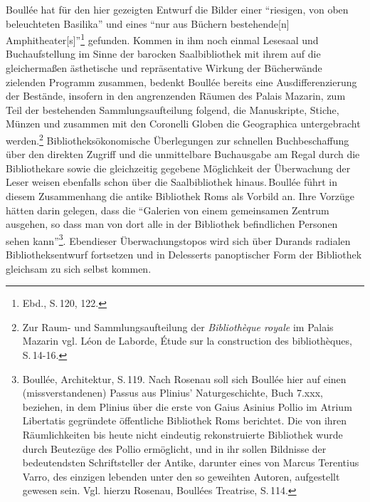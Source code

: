 Boullée hat für den hier gezeigten Entwurf die Bilder einer
\enquote{riesigen, von oben beleuchteten Basilika} und eines
\enquote{nur aus Büchern bestehende{[}n{]}
Amphitheater{[}s{]}}\footnote{Ebd., S.\,120, 122.} gefunden. Kommen in
ihm noch einmal Lesesaal und Buchaufstellung im Sinne der barocken
Saalbibliothek mit ihrem auf die gleichermaßen ästhetische und
repräsentative Wirkung der Bücherwände zielenden Programm zusammen,
bedenkt Boullée bereits eine Ausdifferenzierung der Bestände, insofern
in den angrenzenden Räumen des Palais Mazarin, zum Teil der bestehenden
Sammlungsaufteilung folgend, die Manuskripte, Stiche, Münzen und
zusammen mit den Coronelli Globen die Geographica untergebracht
werden.\footnote{Zur Raum- und Sammlungsaufteilung der
  \emph{Bibliothèque royale} im Palais Mazarin vgl. Léon de Laborde,
  Étude sur la construction des bibliothèques, S.\,14-16.}
Bibliotheksökonomische Überlegungen zur schnellen Buchbeschaffung über
den direkten Zugriff und die unmittelbare Buchausgabe am Regal durch die
Bibliothekare sowie die gleichzeitig gegebene Möglichkeit der
Überwachung der Leser weisen ebenfalls schon über die Saalbibliothek
hinaus.\,Boullée führt in diesem Zusammenhang die antike Bibliothek Roms
als Vorbild an. Ihre Vorzüge hätten darin gelegen, dass die
\enquote{Galerien von einem gemeinsamen Zentrum ausgehen, so dass man
von dort alle in der Bibliothek befindlichen Personen sehen
kann}\footnote{Boullée, Architektur, S.\,119. Nach Rosenau soll sich
  Boullée hier auf einen (missverstandenen) Passus aus Plinius'
  Naturgeschichte, Buch 7.xxx, beziehen, in dem Plinius über die erste
  von Gaius Asinius Pollio im Atrium Libertatis gegründete öffentliche
  Bibliothek Roms berichtet. Die von ihren Räumlichkeiten bis heute
  nicht eindeutig rekonstruierte Bibliothek wurde durch Beutezüge des
  Pollio ermöglicht, und in ihr sollen Bildnisse der bedeutendsten
  Schriftsteller der Antike, darunter eines von Marcus Terentius Varro,
  des einzigen lebenden unter den so geweihten Autoren, aufgestellt
  gewesen sein. Vgl. hierzu Rosenau, Boullées Treatrise, S.\,114.}.
Ebendieser Überwachungstopos wird sich über Durands radialen
Bibliotheksentwurf fortsetzen und in Delesserts panoptischer Form der
Bibliothek gleichsam zu sich selbst kommen.

